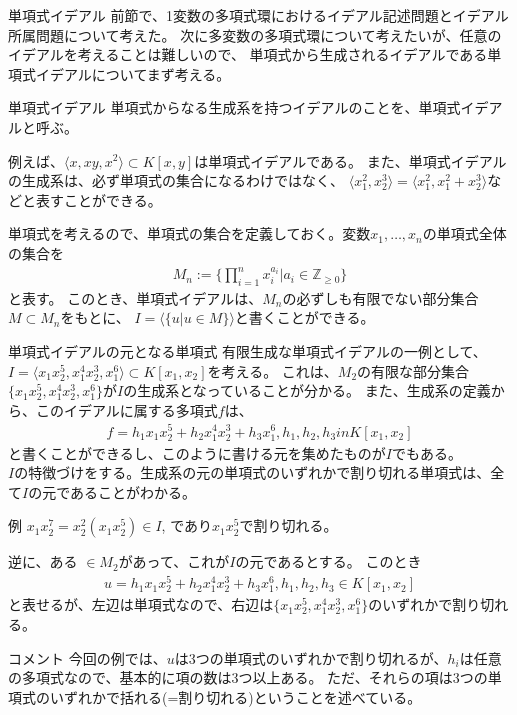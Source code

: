 \begin{frame} {単項式イデアル}
	前節で、1変数の多項式環におけるイデアル記述問題とイデアル所属問題について考えた。
	次に多変数の多項式環について考えたいが、任意のイデアルを考えることは難しいので、
	単項式から生成されるイデアルである単項式イデアルについてまず考える。
	\begin{definition} {単項式イデアル}
		単項式からなる生成系を持つイデアルのことを、単項式イデアルと呼ぶ。
	\end{definition}
	例えば、$\langle x, xy, x^2 \rangle \subset K[x,y]$は単項式イデアルである。
	また、単項式イデアルの生成系は、必ず単項式の集合になるわけではなく、
	$\langle x_1^2, x_2^3 \rangle = \langle x_1^2, x_1^2+x_2^3 \rangle$などと表すことができる。
\end{frame}

\begin{frame}
	単項式を考えるので、単項式の集合を定義しておく。変数$x_1, \ldots, x_n$の単項式全体の集合を
	\begin{align*}
		M_n := \{ \prod_{i=1}^n x_i^{a_i} | a_i \in \mathbb{Z}_{\geq 0} \}
	\end{align*}
	と表す。
	このとき、単項式イデアルは、$M_n$の必ずしも有限でない部分集合$M \subset M_n$をもとに、
	$I = \langle \{ u | u \in M \} \rangle$と書くことができる。
\end{frame}

\begin{frame} {単項式イデアルの元となる単項式}
	有限生成な単項式イデアルの一例として、$I = \langle x_1 x_2^5, x_1^4 x_2^3, x_1^6 \rangle \subset K[x_1, x_2]$を考える。
	これは、$M_2$の有限な部分集合$\{x_1 x_2^5, x_1^4 x_2^3, x_1^6\}$が$I$の生成系となっていることが分かる。
	また、生成系の定義から、このイデアルに属する多項式$f$は、
	\begin{align*}
		f = h_1 x_1 x_2^5 + h_2 x_1^4 x_2^3 + h_3 x_1^6, h_1, h_2, h_3 in K[x_1, x_2]
	\end{align*}
	と書くことができるし、このように書ける元を集めたものが$I$でもある。\\
	$I$の特徴づけをする。生成系の元の単項式のいずれかで割り切れる単項式は、全て$I$の元であることがわかる。\\
	\begin{exampleblock} {例}
		$x_1 x_2^7 = x_2^2 (x_1 x_2^5) \in I$, であり$x_1 x_2^5$で割り切れる。
	\end{exampleblock}
\end{frame}

\begin{frame}
	逆に、ある $\in M_2$があって、これが$I$の元であるとする。
	このとき
	\begin{align*}
		u = h_1 x_1 x_2^5 + h_2 x_1^4 x_2^3 + h_3 x_1^6, h_1, h_2, h_3 \in K[x_1, x_2]
	\end{align*}
	と表せるが、左辺は単項式なので、右辺は$\{ x_1 x_2^5, x_1^4 x_2^3, x_1^6 \}$のいずれかで割り切れる。
	\begin{block} {コメント}
		今回の例では、$u$は3つの単項式のいずれかで割り切れるが、$h_i$は任意の多項式なので、基本的に項の数は3つ以上ある。
		ただ、それらの項は3つの単項式のいずれかで括れる(=割り切れる)ということを述べている。
	\end{block}
\end{frame}

